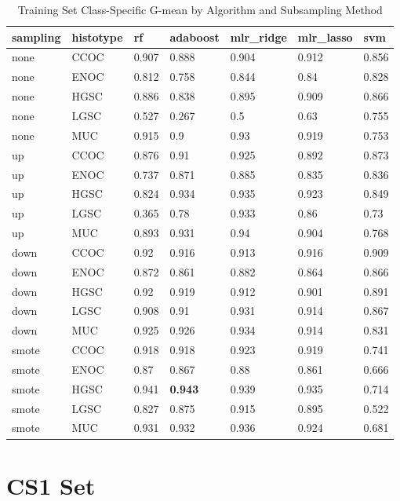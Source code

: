\documentclass[
]{report}
\begin{document}
\begin{table}

\caption{\label{tab:train-gmean-class-table}Training Set Class-Specific G-mean by Algorithm and Subsampling Method}
\centering
\begin{tabular}[t]{l|l|l|l|l|l|l}
\hline
sampling & histotype & rf & adaboost & mlr\_ridge & mlr\_lasso & svm\\
\hline
none & CCOC & 0.907 & 0.888 & 0.904 & 0.912 & 0.856\\
\hline
none & ENOC & 0.812 & 0.758 & 0.844 & 0.84 & 0.828\\
\hline
none & HGSC & 0.886 & 0.838 & 0.895 & 0.909 & 0.866\\
\hline
none & LGSC & 0.527 & 0.267 & 0.5 & 0.63 & 0.755\\
\hline
none & MUC & 0.915 & 0.9 & 0.93 & 0.919 & 0.753\\
\hline
up & CCOC & 0.876 & 0.91 & 0.925 & 0.892 & 0.873\\
\hline
up & ENOC & 0.737 & 0.871 & 0.885 & 0.835 & 0.836\\
\hline
up & HGSC & 0.824 & 0.934 & 0.935 & 0.923 & 0.849\\
\hline
up & LGSC & 0.365 & 0.78 & 0.933 & 0.86 & 0.73\\
\hline
up & MUC & 0.893 & 0.931 & 0.94 & 0.904 & 0.768\\
\hline
down & CCOC & 0.92 & 0.916 & 0.913 & 0.916 & 0.909\\
\hline
down & ENOC & 0.872 & 0.861 & 0.882 & 0.864 & 0.866\\
\hline
down & HGSC & 0.92 & 0.919 & 0.912 & 0.901 & 0.891\\
\hline
down & LGSC & 0.908 & 0.91 & 0.931 & 0.914 & 0.867\\
\hline
down & MUC & 0.925 & 0.926 & 0.934 & 0.914 & 0.831\\
\hline
smote & CCOC & 0.918 & 0.918 & 0.923 & 0.919 & 0.741\\
\hline
smote & ENOC & 0.87 & 0.867 & 0.88 & 0.861 & 0.666\\
\hline
smote & HGSC & 0.941 & \textbf{0.943} & 0.939 & 0.935 & 0.714\\
\hline
smote & LGSC & 0.827 & 0.875 & 0.915 & 0.895 & 0.522\\
\hline
smote & MUC & 0.931 & 0.932 & 0.936 & 0.924 & 0.681\\
\hline
\end{tabular}
\end{table}

\hypertarget{cs1-set}{%
\section{CS1 Set}\label{cs1-set}}
\end{document}

